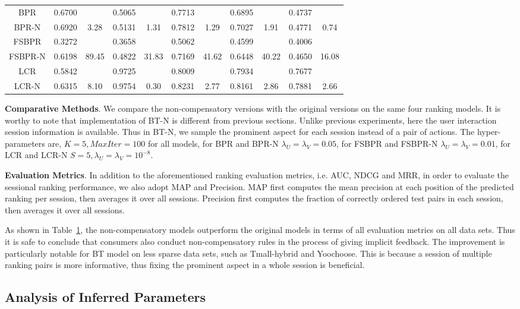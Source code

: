 \documentclass[letterpaper]{article} %
\begin{document}
\begin{table}[ht]
{\begin{tabular}{c cc |cc |cc|cc|cc}
BPR&	0.6700	&&	0.5065	&&	0.7713&&		0.6895	&&	0.4737&\\	
BPR-N	&0.6920	&3.28&	0.5131	&1.31&	0.7812&	1.29&	0.7027	&1.91&	0.4771	&0.74\\
FSBPR	&0.3272 	&&	0.3658 	&&	0.5062 	&&	0.4599 	&&	0.4006 	&\\
FSBPR-N	&0.6198 &	89.45&	0.4822 &	31.83&	0.7169& 	41.62&	0.6448 &	40.22&	0.4650 &	16.08\\
LCR	&0.5842 	&&	0.9725 	&&	0.8009 &&		0.7934 	&&	0.7677 	&\\
LCR-N&	0.6315 &	8.10&	0.9754 &	0.30&	0.8231 &	2.77&	0.8161 &	2.86&	0.7881 &	2.66	\\
\hline
\end{tabular}}
\label{tab:gradedresult}
\end{table}

\textbf{Comparative Methods}. We compare the non-compensatory versions with the original versions on the same four ranking models. It is worthy to note that implementation of BT-N is different from previous sections. Unlike previous experiments, here the user interaction session information is available. Thus in BT-N, we sample the prominent aspect for each session instead of a pair of actions. The hyper-parameters are, $K=5, MaxIter=100$ for all models, for BPR and BPR-N $\lambda_U=\lambda_V=0.05$, for FSBPR and FSBPR-N $\lambda_U=\lambda_V=0.01$, for LCR and LCR-N $S=5, \lambda_U=\lambda_V=10^{-8}$.  

\textbf{Evaluation Metrics}.  In addition to the aforementioned  ranking evaluation metrics, i.e. AUC, NDCG and MRR, in order to evaluate the sessional ranking performance, we also adopt  MAP and Precision. MAP first computes the mean precision at each position of the predicted ranking per session, then averages it over all sessions. Precision first computes the fraction of correctly ordered test pairs in each session, then averages it over all sessions. 

As shown in Table~\ref{tab:gradedresult}, the non-compensatory models outperform the original models in terms of all evaluation metrics on all data sets. Thus it is safe to conclude that consumers also conduct non-compensatory rules in the process of giving implicit feedback. The improvement is particularly notable for BT model on less sparse data sets, such as Tmall-hybrid and Yoochoose. This is because a session of multiple ranking pairs is more informative, thus fixing the prominent aspect in a whole session is beneficial.

\subsection{Analysis of Inferred Parameters}
\end{document}
